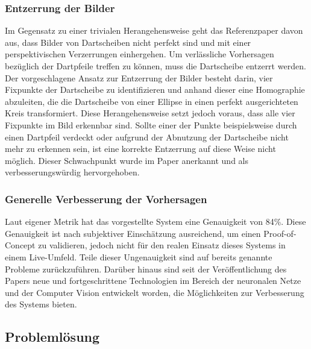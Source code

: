 \subsubsection{Entzerrung der Bilder}
\label{sec:ziele:schwachstellen:entzerrung}

Im Gegensatz zu einer trivialen Herangehensweise geht das Referenzpaper davon aus, dass Bilder von Dartscheiben nicht perfekt sind und mit einer perspektivischen Verzerrungen einhergehen. Um verlässliche Vorhersagen bezüglich der Dartpfeile treffen zu können, muss die Dartscheibe entzerrt werden. Der vorgeschlagene Ansatz zur Entzerrung der Bilder besteht darin, vier Fixpunkte der Dartscheibe zu identifizieren und anhand dieser eine Homographie abzuleiten, die die Dartscheibe von einer Ellipse in einen perfekt ausgerichteten Kreis transformiert. Diese Herangehensweise setzt jedoch voraus, dass alle vier Fixpunkte im Bild erkennbar sind. Sollte einer der Punkte beispielsweise durch einen Dartpfeil verdeckt oder aufgrund der Abnutzung der Dartscheibe nicht mehr zu erkennen sein, ist eine korrekte Entzerrung auf diese Weise nicht möglich. Dieser Schwachpunkt wurde im Paper anerkannt und als verbesserungswürdig hervorgehoben.

\subsubsection{Generelle Verbesserung der Vorhersagen}
\label{sec:ziele:schwachstellen:verbesserung}

Laut eigener Metrik hat das vorgestellte System eine Genauigkeit von 84\%. Diese Genauigkeit ist nach subjektiver Einschätzung ausreichend, um einen Proof-of-Concept zu validieren, jedoch nicht für den realen Einsatz dieses Systems in einem Live-Umfeld. Teile dieser Ungenauigkeit sind auf bereits genannte Probleme zurückzuführen. Darüber hinaus sind seit der Veröffentlichung des Papers neue und fortgeschrittene Technologien im Bereich der neuronalen Netze und der Computer Vision entwickelt worden, die Möglichkeiten zur Verbesserung des Systems bieten.


\subsection{Problemlösung}
\label{sec:ziele:problemlösung}

